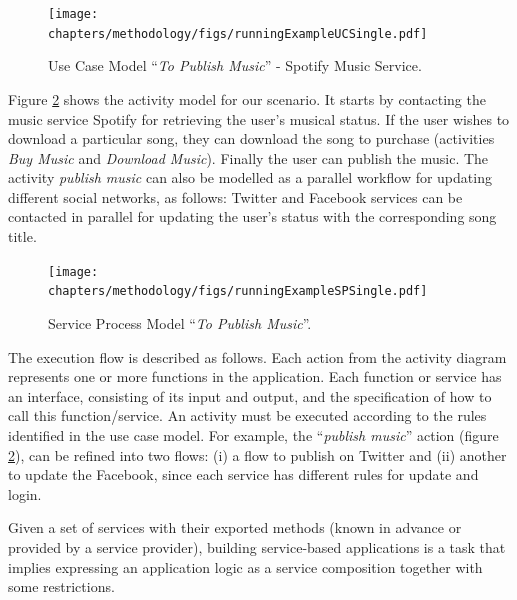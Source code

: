 \begin{figure}[ht!]
\centering
\texttt{[image: chapters/methodology/figs/runningExampleUCSingle.pdf]}
\caption{Use Case Model ``\textit{To Publish Music}'' - Spotify Music Service.}
\label{fig:example_usecase}
\end{figure}





Figure \ref{fig:example_serviceprocess} shows the activity model for our
scenario. It starts by contacting the music service Spotify for retrieving the
user's musical status.  If the user wishes to download a particular song, they
can download the song to purchase (activities \textit{Buy Music} and
\textit{Download Music}). Finally the user can publish the music. The activity
\textit{publish music} can also be modelled as a parallel workflow for updating
different social networks, as follows: Twitter and Facebook services can be
contacted in parallel for updating the user's status with the corresponding song title.

\begin{figure}
\centering
\texttt{[image: chapters/methodology/figs/runningExampleSPSingle.pdf]}
\caption{Service Process Model ``\textit{To Publish Music}''.}
\label{fig:example_serviceprocess}
\end{figure}

The execution flow is described as follows. Each action from the activity
diagram represents one or more functions in the application. Each function or
service has an interface, consisting of its input and output, and the
specification of how to call this function/service. An activity must
be executed according to the rules identified in the use case model. For example, the
``\textit{publish music}'' action (figure \ref{fig:example_serviceprocess}),
can be refined into two flows: (i) a flow to publish on Twitter and (ii) another to
update the Facebook, since each service has different rules for update and
login.

Given a set of services with their exported methods (known
in advance or provided by a service provider), building service-based
applications is a task that implies expressing an application logic as a service
composition together with some restrictions. 



